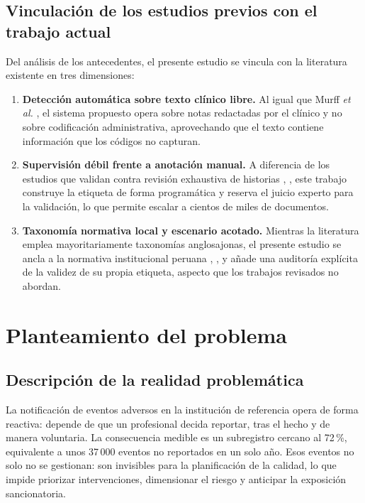 \documentclass[conference]{IEEEtran}
\begin{document}
\subsection{Vinculación de los estudios previos con el trabajo actual}
Del análisis de los antecedentes, el presente estudio se vincula con la
literatura existente en tres dimensiones:

\begin{enumerate}
\item \textbf{Detección automática sobre texto clínico libre.} Al igual que
Murff \emph{et al.} \cite{murff}, el sistema propuesto opera sobre notas
redactadas por el clínico y no sobre codificación administrativa,
aprovechando que el texto contiene información que los códigos no capturan.
\item \textbf{Supervisión débil frente a anotación manual.} A diferencia de
los estudios que validan contra revisión exhaustiva de historias
\cite{brennan}, \cite{classen}, este trabajo construye la etiqueta de forma
programática \cite{snorkel} y reserva el juicio experto para la validación,
lo que permite escalar a cientos de miles de documentos.
\item \textbf{Taxonomía normativa local y escenario acotado.} Mientras la
literatura emplea mayoritariamente taxonomías anglosajonas, el presente estudio
se ancla a la normativa institucional peruana \cite{directiva02},
\cite{directiva7}, y añade una auditoría explícita de la validez de su propia
etiqueta, aspecto que los trabajos revisados no abordan.
\end{enumerate}

\section{Planteamiento del problema}

\subsection{Descripción de la realidad problemática}
La notificación de eventos adversos en la institución de referencia opera de forma reactiva: depende
de que un profesional decida reportar, tras el hecho y de manera voluntaria. La
consecuencia medible es un subregistro cercano al 72\,\%, equivalente a unos
37\,000 eventos no reportados en un solo año. Esos eventos no solo no se
gestionan: son invisibles para la planificación de la calidad, lo que impide
priorizar intervenciones, dimensionar el riesgo y anticipar la exposición
sancionatoria.
\end{document}
